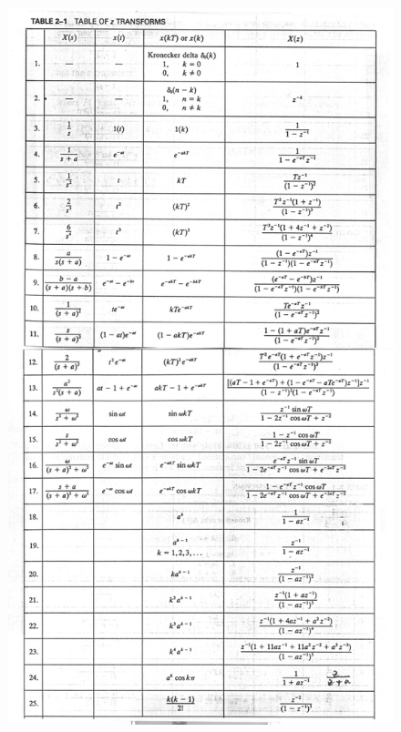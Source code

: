 \newpage
\begin{figure}
\includegraphics[width=0.75\linewidth]{Table_z_Transforms.pdf}
\end{figure}
